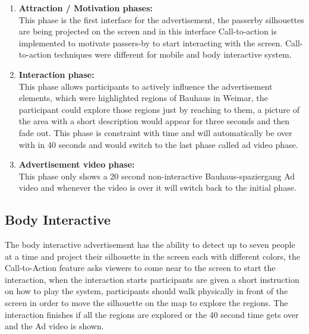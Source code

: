 \begin{enumerate}

\item \textbf{Attraction / Motivation phases:}\\ 
This phase is the first interface for the advertisement, the passerby silhouettes are being projected on the screen and in this interface Call-to-action is implemented to motivate passers-by to start interacting with the screen.
Call-to-action techniques were different for mobile and body interactive system.

\item \textbf{Interaction phase:} \\
This phase allows participants to actively influence the advertisement elements, which were highlighted regions of Bauhaus in Weimar, the participant could explore those regions just by reaching to them, a picture of the area with a short description would appear for three seconds and then fade out. This phase is constraint with time and will automatically be over with in 40 seconds and would switch to the last phase called ad video phase.

\item \textbf{Advertisement video phase:} \\
This phase only shows a 20 second non-interactive Bauhaus-spaziergang Ad video and whenever the video is over it will switch back to the initial phase.

\end{enumerate}

\subsection{Body Interactive}

The body interactive advertisement has the ability to detect up to seven people at a time and project their silhouette in the screen each with different colors, the Call-to-Action feature asks viewers to come near to the screen to start the interaction, when the interaction starts participants are given a short instruction on how to play the system, participants should walk physically in front of the screen in order to move the silhouette on the map to explore the regions. The interaction finishes if all the regions are explored or the 40 second time gets over and the Ad video is shown.


